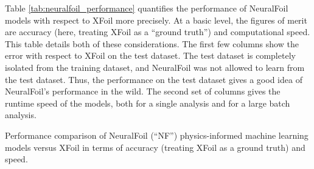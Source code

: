 \documentclass[12pt,vi,oneside,table]{report}
\begin{document}
    Table \ref{tab:neuralfoil_performance} quantifies the performance of NeuralFoil models with respect to XFoil more precisely. At a basic level, the figures of merit are accuracy (here, treating XFoil as a ``ground truth'') and computational speed. This table details both of these considerations. The first few columns show the error with respect to XFoil on the test dataset. The test dataset is completely isolated from the training dataset, and NeuralFoil was not allowed to learn from the test dataset. Thus, the performance on the test dataset gives a good idea of NeuralFoil's performance in the wild. The second set of columns gives the runtime speed of the models, both for a single analysis and for a large batch analysis.

    \begin{table}[h]
        \centering
        \caption{Performance comparison of NeuralFoil (``NF'') physics-informed machine learning models versus XFoil in terms of accuracy (treating XFoil as a ground truth) and speed.}
        \label{tab:neuralfoil_performance}

        \begin{adjustbox}{width=\textwidth}


\end{adjustbox}
\end{table}
\end{document}

